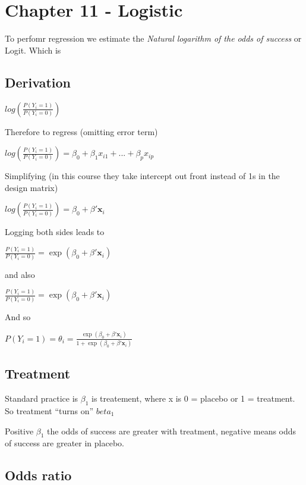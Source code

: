 \documentclass[
  letterpaper,
  DIV=11,
  numbers=noendperiod]{scrreprt}
\begin{document}

\hypertarget{chapter-11---logistic}{%
\chapter{Chapter 11 - Logistic}\label{chapter-11---logistic}}

To perfomr regression we estimate the \emph{Natural logarithm of the
odds of success} or Logit. Which is

\hypertarget{derivation}{%
\section{Derivation}\label{derivation}}

\(log(\frac{P(Y_i = 1)}{P(Y_i = 0)})\)

Therefore to regress (omitting error term)

\(log(\frac{P(Y_i = 1)}{P(Y_i = 0)}) = \beta_0 + \beta_1x_{i1} + ... + \beta_px_{ip}\)

Simplifying (in this course they take intercept out front instead of 1s
in the design matrix)

\(log(\frac{P(Y_i = 1)}{P(Y_i = 0)}) = \beta_0 + \beta'\mathbf{x}_i\)

Logging both sides leads to

\(\frac{P(Y_i = 1)}{P(Y_i = 0)} = \exp(\beta_0 + \beta'\mathbf{x}_i)\)

and also

\(\frac{P(Y_i = 1)}{P(Y_i = 0)} = \exp(\beta_0 + \beta'\mathbf{x}_i)\)

And so

\(P(Y_i = 1)= \theta_i = \frac{\exp(\beta_0 + \beta'\mathbf{x}_i)}{1+\exp(\beta_0 + \beta'\mathbf{x}_i)}\)

\hypertarget{treatment}{%
\section{Treatment}\label{treatment}}

Standard practice is \(\beta_1\) is treatement, where x is 0 = placebo
or 1 = treatment. So treatment ``turns on'' \(beta_1\)

Positive \(\beta_1\) the odds of success are greater with treatment,
negative means odds of success are greater in placebo.

\hypertarget{odds-ratio}{%
\section{Odds ratio}\label{odds-ratio}}
\end{document}
